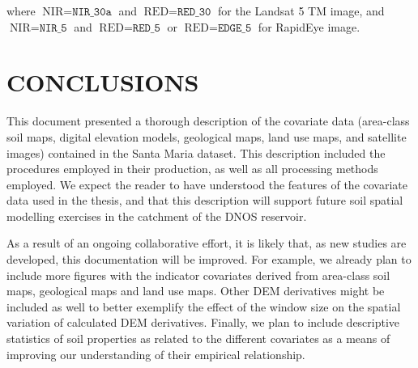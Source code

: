 \noindent where $\text{NIR} = \texttt{NIR\_30a}$ and $\text{RED} = \texttt{RED\_30}$ for the Landsat 5 TM 
image, and 
$\text{NIR} = \texttt{NIR\_5}$ and $\text{RED} = \texttt{RED\_5}$ or $\text{RED} = \texttt{EDGE\_5}$ for 
RapidEye 
image.

\section{CONCLUSIONS}

This document presented a thorough description of the covariate data (area-class soil maps, digital elevation 
models, geological maps, land use maps, and satellite images) contained in the Santa Maria dataset. This 
description included the procedures employed in their production, as well as all processing methods employed. 
We expect the reader to have understood the features of the covariate data used in the thesis, and that this 
description will support future soil spatial modelling exercises in the catchment of the DNOS reservoir.

As a result of an ongoing collaborative effort, it is likely that, as new studies are developed, this 
documentation will be improved. For example, we already plan to include more figures with the indicator 
covariates derived from area-class soil maps, geological maps and land use maps. Other DEM derivatives might be 
included as well to better exemplify the effect of the window size on the spatial variation of calculated DEM 
derivatives. Finally, we plan to include descriptive statistics of soil properties as related to the different 
covariates as a means of improving our understanding of their empirical relationship.
